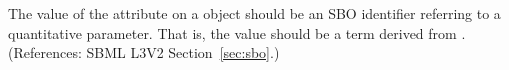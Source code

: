 The value of the attribute  on a \LocalParameter object should be
an SBO identifier referring to a quantitative parameter.  That is, the
value should be a term derived from \sboparameter.  (References: SBML
 L3V2 Section~\ref{sec:sbo}.)
